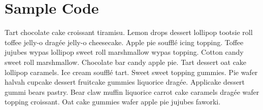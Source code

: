 \documentclass{uumthesis}
\begin{document}
\chapter{Sample Code}
Tart chocolate cake croissant tiramisu. Lemon drops dessert lollipop tootsie roll toffee jelly-o dragée jelly-o cheesecake. Apple pie soufflé icing topping. Toffee jujubes wypas lollipop sweet roll marshmallow wypas topping. Cotton candy sweet roll marshmallow. Chocolate bar candy apple pie. Tart dessert oat cake lollipop caramels. Ice cream soufflé tart. Sweet sweet topping gummies. Pie wafer halvah cupcake dessert fruitcake gummies liquorice dragée. Applicake dessert gummi bears pastry. Bear claw muffin liquorice carrot cake caramels dragée wafer topping croissant. Oat cake gummies wafer apple pie jujubes faworki.
\end{document}
